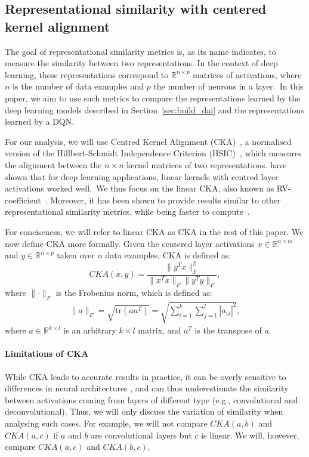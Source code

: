 \documentclass[twoside,11pt]{article}
\begin{document}
\subsection{Representational similarity with centered kernel alignment}\label{ssec:similarity}
The goal of representational similarity metrics is, as its name indicates, to measure the similarity between two representations.
In the context of deep learning, these representations correspond to $\mathbb{R}^{n \times p}$ matrices of activations, where
$n$ is the number of data examples and $p$ the number of neurons in a layer.~In this paper, we aim to use such metrics to compare the representations learned by the deep learning models described in Section~\ref{sec:build_dai} and the
representations learned by a DQN.

For our analysis, we will use Centred Kernel Alignment (CKA)~\citep{Cortes2012,Cristianini2002}, a normalised version of the Hillbert-Schmidt Independence Criterion (HSIC)~\citep{Gretton2005}, which measures the alignment between the $n \times n$ kernel matrices of two representations. \citet{Kornblith2019} have shown that for deep learning applications, linear kernels with centred layer activations worked well.~We thus focus on the linear CKA, also known as RV-coefficient~\citep{Robert1976}. Moreover, it has been shown to provide results similar to other representational similarity metrics, while being faster to compute~\citep{Bonheme2022}.

For conciseness, we will refer to linear CKA as CKA in the rest of this paper.
We now define CKA more formally. Given the centered layer activations $x \in \mathbb{R}^{n \times m}$ and $y \in \mathbb{R}^{n \times p}$ taken over $n$ data examples, CKA is defined as:
\begin{equation*}
    CKA(x, y) = \frac{\lVert y^Tx \rVert_F^2}{\lVert x^Tx \rVert_F\lVert y^Ty \rVert_F},
\end{equation*}
where $\lVert{\cdot}\rVert_F$ is the Frobenius norm, which is defined as:
\begin{align*}
\lVert{a}\rVert_F = \sqrt{\text{tr}(aa^T)} = \sqrt{\sum_{i=1}^k\sum_{j=1}^l |a_{ij}|^2},
\end{align*}
where $a \in \mathbb{R}^{k\times l}$ is an arbitrary $k \times l$ matrix, and $a^T$ is the transpose of $a$.

\paragraph{Limitations of CKA}
While CKA leads to accurate results in practice, it can be overly sensitive to differences in neural architectures \citep{Maheswaranathan2019}, and can thus underestimate the similarity between activations coming from layers of different type (e.g., convolutional and deconvolutional). Thus, we will only discuss the variation of similarity when analysing such cases.
For example, we will not compare $CKA(a, b)$ and $CKA(a, c)$ if $a$ and $b$ are convolutional layers but
$c$ is linear. We will, however, compare $CKA(a, c)$ and $CKA(b, c)$.
\end{document}
